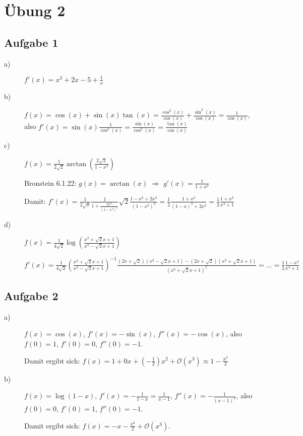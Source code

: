 \chapter{Übung 2}

\section*{Aufgabe 1}

\begin{description}
	\item[a)] $f'(x) = x^3 + 2x - 5 + \frac{1}{x}$
	\item[b)] $f(x) = \cos(x) + \sin(x) \tan(x) = \frac{\cos^2(x)}{\cos(x)} + \frac{\sin^2(x)}{\cos(x)} = \frac{1}{\cos(x)}$, also $f'(x) =\sin(x) \frac{1}{\cos^2(x)} = \frac{\sin(x)}{\cos^2(x)} = \frac{\tan(x)}{\cos(x)}$
	\item[c)] $f(x) = \frac{1}{2 \sqrt{2}} \arctan\left( \frac{2 \sqrt{2}}{1 - x^2} \right)$
	
	Bronstein 6.1.22: $g(x) = \arctan(x)$ $\Rightarrow$ $g'(x) = \frac{1}{1 + x^2}$
	
	Damit: $f'(x) 
	= \frac{1}{2 \sqrt{x}} \frac{1}{1 + \frac{2x^2}{(1 - x^2)^2}} \sqrt{2} \frac{1 - x^2 + 2x^2}{(1 - x^2)^2}
	= \frac{1}{2} \frac{1 + x^2}{(1 - x)^2 + 2x^2}
	= \frac{1}{2} \frac{1 + x^2}{x^4 + 1}$
	
	\item[d)] $f(x) = \frac{1}{4 \sqrt{2}} \log \left( \frac{x^2 + \sqrt{2} x + 1}{x^2 - \sqrt{2}x + 1} \right)$
	
	$f'(x) 
	= \frac{1}{4 \sqrt{2}} \left( \frac{x^2 + \sqrt{2}x + 1}{x^2 - \sqrt{2}x + 1} \right)^{-1} \frac{(2x + \sqrt{2})(x^2 - \sqrt{2}x + 1)-(2x + \sqrt{2})(x^2 + \sqrt{2}x + 1)}{(x^2 + \sqrt{2}x + 1)^2}
	= \dots 
	= \frac{1}{2} \frac{1 - x^2}{x^4 + 1}$
\end{description}

\section*{Aufgabe 2}

\begin{description}
	\item[a)] $f(x) = \cos(x)$, $f'(x) = -\sin(x)$, $f''(x) = -\cos(x)$, also $f(0) = 1$, $f'(0) = 0$, $f''(0) = -1$.
	
	Damit ergibt sich: $f(x) = 1 + 0 x + \left( -\frac{1}{2} \right)x^2 + \mathcal{O}(x^3) \approx 1 - \frac{x^2}{2}$
	
	\item[b)] $f(x) = \log(1 - x)$, $f'(x) = -\frac{1}{1 - x} = \frac{1}{x - 1}$, $f''(x) = -\frac{1}{(x - 1)^2}$, also $f(0) = 0$, $f'(0) = 1$, $f''(0) = -1$.
	
	Damit ergibt sich: $f(x) = -x - \frac{x^2}{2} + \mathcal{O}(x^3)$.
\end{description}

